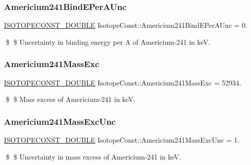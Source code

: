 \subsubsection{\texorpdfstring{Americium241\+Bind\+E\+Per\+A\+Unc}{Americium241BindEPerAUnc}}
{\footnotesize\ttfamily \mbox{\hyperlink{group___isotope_const-_macros_ga8f45a7272ce02c0b4c65c44636ed719a}{I\+S\+O\+T\+O\+P\+E\+C\+O\+N\+S\+T\+\_\+\+D\+O\+U\+B\+LE}} Isotope\+Const\+::\+Americium241\+Bind\+E\+Per\+A\+Unc = 0.}

\$ \$ Uncertainty in binding energy per A of Americium-\/241 in keV. \mbox{\label{group___isotope_const-_americium-_am241_ga536fccfa82398506ad877d0875da2223}} 
\subsubsection{\texorpdfstring{Americium241\+Mass\+Exc}{Americium241MassExc}}
{\footnotesize\ttfamily \mbox{\hyperlink{group___isotope_const-_macros_ga8f45a7272ce02c0b4c65c44636ed719a}{I\+S\+O\+T\+O\+P\+E\+C\+O\+N\+S\+T\+\_\+\+D\+O\+U\+B\+LE}} Isotope\+Const\+::\+Americium241\+Mass\+Exc = 52934.}

\$ \$ Mass excess of Americium-\/241 in keV. \mbox{\label{group___isotope_const-_americium-_am241_gade825c8f3ac0fd0586fce40ed70dff7f}} 
\subsubsection{\texorpdfstring{Americium241\+Mass\+Exc\+Unc}{Americium241MassExcUnc}}
{\footnotesize\ttfamily \mbox{\hyperlink{group___isotope_const-_macros_ga8f45a7272ce02c0b4c65c44636ed719a}{I\+S\+O\+T\+O\+P\+E\+C\+O\+N\+S\+T\+\_\+\+D\+O\+U\+B\+LE}} Isotope\+Const\+::\+Americium241\+Mass\+Exc\+Unc = 1.}

\$ \$ Uncertainty in mass excess of Americium-\/241 in keV. \mbox{\label{group___isotope_const-_americium-_am241_gaa811412603b8766fab6dc62ae6167ed0}} 
